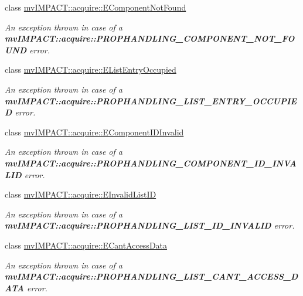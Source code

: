 \begin{DoxyCompactItemize}
class \hyperlink{classmv_i_m_p_a_c_t_1_1acquire_1_1_e_component_not_found}{mv\+I\+M\+P\+A\+C\+T\+::acquire\+::\+E\+Component\+Not\+Found}
\begin{DoxyCompactList}\small\item\em An exception thrown in case of a {\bfseries mv\+I\+M\+P\+A\+C\+T\+::acquire\+::\+P\+R\+O\+P\+H\+A\+N\+D\+L\+I\+N\+G\+\_\+\+C\+O\+M\+P\+O\+N\+E\+N\+T\+\_\+\+N\+O\+T\+\_\+\+F\+O\+U\+N\+D} error. \end{DoxyCompactList}\item 
class \hyperlink{classmv_i_m_p_a_c_t_1_1acquire_1_1_e_list_entry_occupied}{mv\+I\+M\+P\+A\+C\+T\+::acquire\+::\+E\+List\+Entry\+Occupied}
\begin{DoxyCompactList}\small\item\em An exception thrown in case of a {\bfseries mv\+I\+M\+P\+A\+C\+T\+::acquire\+::\+P\+R\+O\+P\+H\+A\+N\+D\+L\+I\+N\+G\+\_\+\+L\+I\+S\+T\+\_\+\+E\+N\+T\+R\+Y\+\_\+\+O\+C\+C\+U\+P\+I\+E\+D} error. \end{DoxyCompactList}\item 
class \hyperlink{classmv_i_m_p_a_c_t_1_1acquire_1_1_e_component_i_d_invalid}{mv\+I\+M\+P\+A\+C\+T\+::acquire\+::\+E\+Component\+I\+D\+Invalid}
\begin{DoxyCompactList}\small\item\em An exception thrown in case of a {\bfseries mv\+I\+M\+P\+A\+C\+T\+::acquire\+::\+P\+R\+O\+P\+H\+A\+N\+D\+L\+I\+N\+G\+\_\+\+C\+O\+M\+P\+O\+N\+E\+N\+T\+\_\+\+I\+D\+\_\+\+I\+N\+V\+A\+L\+I\+D} error. \end{DoxyCompactList}\item 
class \hyperlink{classmv_i_m_p_a_c_t_1_1acquire_1_1_e_invalid_list_i_d}{mv\+I\+M\+P\+A\+C\+T\+::acquire\+::\+E\+Invalid\+List\+I\+D}
\begin{DoxyCompactList}\small\item\em An exception thrown in case of a {\bfseries mv\+I\+M\+P\+A\+C\+T\+::acquire\+::\+P\+R\+O\+P\+H\+A\+N\+D\+L\+I\+N\+G\+\_\+\+L\+I\+S\+T\+\_\+\+I\+D\+\_\+\+I\+N\+V\+A\+L\+I\+D} error. \end{DoxyCompactList}\item 
class \hyperlink{classmv_i_m_p_a_c_t_1_1acquire_1_1_e_cant_access_data}{mv\+I\+M\+P\+A\+C\+T\+::acquire\+::\+E\+Cant\+Access\+Data}
\begin{DoxyCompactList}\small\item\em An exception thrown in case of a {\bfseries mv\+I\+M\+P\+A\+C\+T\+::acquire\+::\+P\+R\+O\+P\+H\+A\+N\+D\+L\+I\+N\+G\+\_\+\+L\+I\+S\+T\+\_\+\+C\+A\+N\+T\+\_\+\+A\+C\+C\+E\+S\+S\+\_\+\+D\+A\+T\+A} error. \end{DoxyCompactList}\item 

\end{DoxyCompactItemize}
